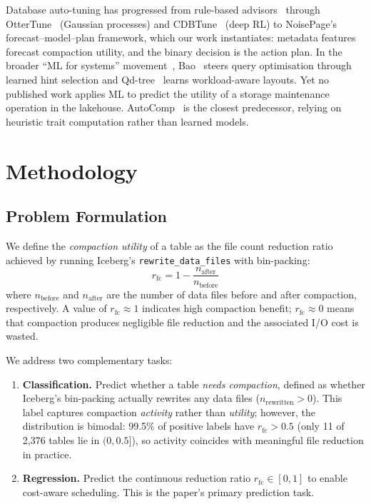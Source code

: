 \documentclass[conference, 10pt]{IEEEtran}
\begin{document}
Database auto-tuning has progressed from rule-based
advisors~\cite{chaudhuri2007selftuning} through
OtterTune~\cite{vanaken2017ottertune} (Gaussian processes) and
CDBTune~\cite{zhang2019cdbtune} (deep RL) to
NoisePage's~\cite{pavlo2021noisepage} forecast--model--plan framework,
which our work instantiates: metadata features forecast compaction
utility, and the binary decision is the action plan.
In the broader ``ML for systems'' movement~\cite{zhou2022dbmeetsai},
Bao~\cite{marcus2021bao} steers query optimisation through learned hint
selection and Qd-tree~\cite{yang2020qdtree} learns workload-aware
layouts. Yet no published work applies ML to predict the utility of a
storage maintenance operation in the lakehouse.
AutoComp~\cite{gruenheid2025autocomp} is the closest predecessor,
relying on heuristic trait computation rather than learned models.

\section{Methodology}

\subsection{Problem Formulation}

We define the \emph{compaction utility} of a table as the file count
reduction ratio achieved by running Iceberg's \texttt{rewrite\_data\_files}
with bin-packing:
\begin{equation}
  r_{\mathrm{fc}} = 1 - \frac{n_{\mathrm{after}}}{n_{\mathrm{before}}}
  \label{eq:rfc}
\end{equation}
where $n_{\mathrm{before}}$ and $n_{\mathrm{after}}$ are the number of data
files before and after compaction, respectively. A value of
$r_{\mathrm{fc}} \approx 1$ indicates high compaction benefit;
$r_{\mathrm{fc}} \approx 0$ means that compaction produces negligible file
reduction and the associated I/O cost is wasted.

We address two complementary tasks:
\begin{enumerate}
\item \textbf{Classification.} Predict whether a table \emph{needs compaction},
      defined as whether Iceberg's bin-packing actually rewrites any data
      files ($n_{\mathrm{rewritten}} > 0$). This label captures compaction
      \emph{activity} rather than \emph{utility}; however, the distribution
      is bimodal: 99.5\% of positive labels have $r_{\mathrm{fc}} > 0.5$
      (only 11 of 2{,}376 tables lie in $(0, 0.5]$), so activity coincides
      with meaningful file reduction in practice.
\item \textbf{Regression.} Predict the continuous reduction ratio
      $r_{\mathrm{fc}} \in [0, 1]$ to enable cost-aware scheduling.
      This is the paper's primary prediction task.
\end{enumerate}
\end{document}
